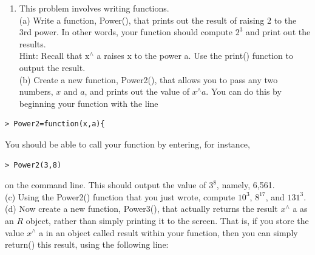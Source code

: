 \documentclass[10pt]{article}
\begin{document}
\begin{enumerate}
(b) Explore the data graphically in order to investigate the association between mpg01 and the other features. Which of the other features seem most likely to be useful in predicting mpg01? Scatterplots and boxplots may be useful tools to answer this question. Describe your findings.\\
(c) Split the data into a training set and a test set.\\
(d) Perform LDA on the training data in order to predict mpg01 using the variables that seemed most associated with mpg01 in (b). What is the test error of the model obtained?\\
(e) Perform QDA on the training data in order to predict mpg01 using the variables that seemed most associated with mpg01 in (b). What is the test error of the model obtained?\\
(f) Perform logistic regression on the training data in order to predict mpg01 using the variables that seemed most associated with mpg01 in (b). What is the test error of the model obtained?\\
(g) Perform KNN on the training data, with several values of $K$, in order to predict mpg01. Use only the variables that seemed most associated with mpg01 in (b). What test errors do you obtain? Which value of $K$ seems to perform the best on this data set?
  \item This problem involves writing functions.\\
(a) Write a function, Power(), that prints out the result of raising 2 to the 3rd power. In other words, your function should compute $2^{3}$ and print out the results.\\
Hint: Recall that $\mathrm{x}^{\wedge}$ a raises x to the power a. Use the print() function to output the result.\\
(b) Create a new function, Power2(), that allows you to pass any two numbers, $x$ and $a$, and prints out the value of $x^{\wedge} a$. You can do this by beginning your function with the line
\end{enumerate}

\begin{verbatim}
> Power2=function(x,a){
\end{verbatim}

You should be able to call your function by entering, for instance,

\begin{verbatim}
> Power2(3,8)
\end{verbatim}

on the command line. This should output the value of $3^{8}$, namely, 6,561.\\
(c) Using the Power2() function that you just wrote, compute $10^{3}$, $8^{17}$, and $131^{3}$.\\
(d) Now create a new function, Power3(), that actually returns the result $x^{\wedge}$ a as an $R$ object, rather than simply printing it to the screen. That is, if you store the value $x^{\wedge}$ a in an object called result within your function, then you can simply return() this result, using the following line:
\end{document}
